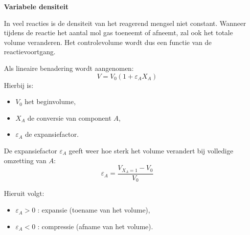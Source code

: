 \documentclass{ximera}
\begin{document}
\begin{remark}
\textbf{Variabele densiteit}

In veel reacties is de densiteit van het reagerend mengsel niet constant. 
Wanneer tijdens de reactie het aantal mol gas toeneemt of afneemt, zal ook het totale volume veranderen. 
Het controlevolume wordt dus een functie van de reactievoortgang.

Als lineaire benadering wordt aangenomen:
\[
V = V_0 (1 + \varepsilon_A X_A)
\]
Hierbij is:
\begin{itemize}
    \item $V_0$ het beginvolume,
    \item $X_A$ de conversie van component $A$,
    \item $\varepsilon_A$ de expansiefactor.
\end{itemize}

De expansiefactor $\varepsilon_A$ geeft weer hoe sterk het volume verandert bij volledige omzetting van $A$:
\[
\varepsilon_A = \frac{V_{X_A=1} - V_0}{V_0}
\]

Hieruit volgt:
\begin{itemize}
    \item $\varepsilon_A > 0$ : expansie (toename van het volume),
    \item $\varepsilon_A < 0$ : compressie (afname van het volume).
\end{itemize}
\end{remark}
\end{document}
